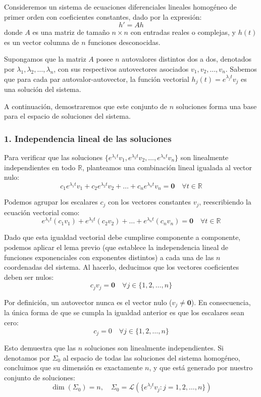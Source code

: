 Consideremos un sistema de ecuaciones diferenciales lineales homogéneo de primer orden con coeficientes constantes, dado por la expresión:
\[
    h' = Ah
\]
donde $A$ es una matriz de tamaño $n \times n$ con entradas reales o complejas, y $h(t)$ es un vector columna de $n$ funciones desconocidas. 

Supongamos que la matriz $A$ posee $n$ autovalores distintos dos a dos, denotados por $\lambda_1, \lambda_2, \dots, \lambda_n$, con sus respectivos autovectores asociados $v_1, v_2, \dots, v_n$. Sabemos que para cada par autovalor-autovector, la función vectorial $h_j(t) = e^{\lambda_j t} v_j$ es una solución del sistema.

A continuación, demostraremos que este conjunto de $n$ soluciones forma una base para el espacio de soluciones del sistema.

\subsubsection*{1. Independencia lineal de las soluciones}

Para verificar que las soluciones $\{ e^{\lambda_1 t} v_1, e^{\lambda_2 t} v_2, \dots, e^{\lambda_n t} v_n \}$ son linealmente independientes en todo $\mathbb{R}$, planteamos una combinación lineal igualada al vector nulo:
\[
    c_1 e^{\lambda_1 t} v_1 + c_2 e^{\lambda_2 t} v_2 + \dots + c_n e^{\lambda_n t} v_n = \mathbf{0} \quad \forall t \in \mathbb{R}
\]

Podemos agrupar los escalares $c_j$ con los vectores constantes $v_j$, reescribiendo la ecuación vectorial como:
\[
    e^{\lambda_1 t} (c_1 v_1) + e^{\lambda_2 t} (c_2 v_2) + \dots + e^{\lambda_n t} (c_n v_n) = \mathbf{0} \quad \forall t \in \mathbb{R}
\]

Dado que esta igualdad vectorial debe cumplirse componente a componente, podemos aplicar el lema previo (que establece la independencia lineal de funciones exponenciales con exponentes distintos) a cada una de las $n$ coordenadas del sistema. Al hacerlo, deducimos que los vectores coeficientes deben ser nulos:
\[
    c_j v_j = \mathbf{0} \quad \forall j \in \{1, 2, \dots, n\}
\]

Por definición, un autovector nunca es el vector nulo ($v_j \neq \mathbf{0}$). En consecuencia, la única forma de que se cumpla la igualdad anterior es que los escalares sean cero:
\[
    c_j = 0 \quad \forall j \in \{1, 2, \dots, n\}
\]

Esto demuestra que las $n$ soluciones son linealmente independientes. Si denotamos por $\Sigma_0$ al espacio de todas las soluciones del sistema homogéneo, concluimos que su dimensión es exactamente $n$, y que está generado por nuestro conjunto de soluciones:
\[
    \dim(\Sigma_0) = n, \quad \Sigma_0 = \mathcal{L}(\{e^{\lambda_j t} v_j : j = 1, 2, \dots, n\})
\]

